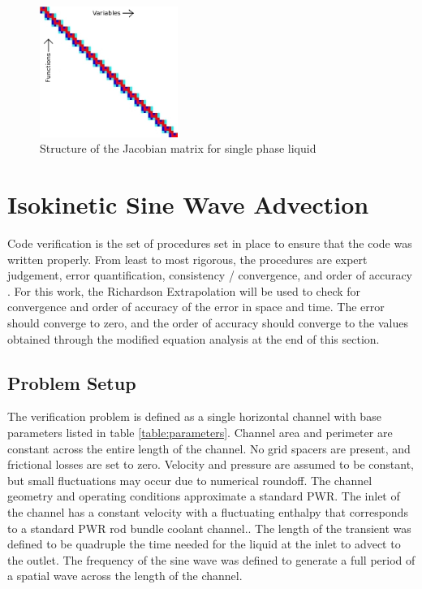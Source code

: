 \documentclass{mc2015}
\begin{document}
    \begin{figure}[!h]
    	\centering
    	\includegraphics[width=0.40\textwidth]{images/Jacobian_Setup}
    	\caption{Structure of the Jacobian matrix for single phase liquid}
    	\label{fig:Jacobian_Setup}
    \end{figure}

\section{Isokinetic Sine Wave Advection}

Code verification is the set of procedures set in place to ensure that the code
was written properly. From least to most rigorous, the procedures are expert
judgement, error quantification, consistency / convergence, and order of
accuracy \cite{Oberkampf2008}. For this work, the Richardson Extrapolation will be
used to check for convergence and order of accuracy of the error in space and
time. The error should converge to zero, and the order of accuracy should
converge to the values obtained through the modified equation analysis at the
end of this section.
 
\subsection{Problem Setup}


The verification problem is defined as a single horizontal channel with
base parameters listed in table \ref{table:parameters}. Channel area and
perimeter are constant across the entire length of the channel. No grid spacers
are present, and frictional losses are set to zero. Velocity and pressure
are assumed to be constant, but small fluctuations may occur due to numerical
roundoff. The channel geometry and operating conditions approximate a standard
PWR. The inlet of the channel has a constant velocity with a fluctuating
enthalpy that corresponds to a standard PWR rod bundle coolant channel..  The
length of the transient was defined to be quadruple the time needed for the liquid at the
inlet to advect to the outlet. The frequency of the sine wave was defined to
generate a full period of a spatial wave across the length of the channel.
\end{document}
